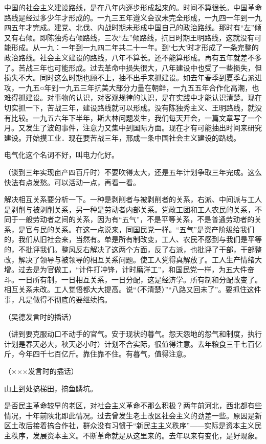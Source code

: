 中国的社会主义建设路线，是在八年内逐步形成起来的。时间不算很长。中国革命路线是经过多少年才形成的。一九三五年遵义会议未完全形成，一九四一年到一九四五年才完成。建党、北伐、内战时期未形成中国自己的政治路线。那时有“左”倾又有右倾。即陈独秀右倾路线，三次“左”倾路线，抗日时期王明路线，这就没有可能形成。从一九：一年到一九四二年共二十一年。到‘七大’时才形成了一条完整的政治路线。社会主义建设的路线，八年不算长。还不能算形成。再有五年就差不多了。苦战三年也可能形成。过去革命中损失很大，八年建设中也受了一些损失，但损失不大。同时这么时期也顾不上，抽不出手来抓建设。如去年春季到夏季右派进攻，一九五○年到一九五三年抗美大部分力量在朝鲜，一九五五年合作化高潮，也难得抓建设。对事物的认识，对客观规律的认识，是在实践中才能认识清楚。现在切实抓一下，苦战三年，建设路线就可以形成。没有陈独秀主义、王明路线，就没有比较。一九五六年下半年，斯大林问题发生，我们每天开会，一篇文章写了一个月。又发生了波匈事件，注意力又集中到国际方面。现在才有可能抽出时间来研究建设。开始摸工业．现在要苦战三年，邢成一条中国社会主义建设的路线。

电气化这个名词不好，叫电力化好。

（谈到三年实现亩产四百斤时）不要吹得太大，还是五年计划争取三年完成。这么快法有点发愁。可以活动一点，再看一看。

解决相互关系要分析一下。一种是剥削者与被剥削者的关系，右派、中间派与工人是剥削与被剥削关系，另一种是劳动者内部关系。党政工团和工人农民的关系，不同于一般劳动者之间的关系，因为有“五气”，不是平等关系，不是普通劳动者的关系，是官与民的关系。在这一点说来，同国民党一样。“五气”是资产阶级给我们的，我们从旧社会来，当然有。单是所有制改变，工人、农民不感到与我们是平等的，不批评我们。整风反右解决了这两个方面，反了右派，也批评了干部，干部整改，解决了领导与被领导的相互关系问题。使工人党得真解放了。工人生产情绪大增。过去是为官做工，“计件打冲锋，计时磨洋工”，和国民党一样，为五大件奋斗。一日所有制，一日相互关系，一日分配，这是经济学。所有制和分配改变了。相互关系未改。工人觉悟都大大提高。说“（不清楚）”“八路又回未了”。要抓住这件事，凡是做得不彻底的要继续搞。

（吴德发言时的插话）

（讲到要克服动口不动手的官气。安于现状的暮气。怨天怨地的怨气和制度，执行计划是春天必大，秋天必小时）计划不合实际，很值得注意。去年粮食三干七百亿斤，今年四千七百亿斤。靠住靠不住。有暮气，值得注意。

（×××发言时的插话）

山上到处搞梯田，搞鱼鳞坑。

是否民主革命较早的老区，对社会主义革命不那么积极？两年前河北，西北都有些情况，十年前陕北即此情况。过去曾发生老土改区社会主义的劲差一些。原因是新区土改后接着搞合作社，群众没有习惯于“新民主主义秩序”——实际是资本主义民主秩序，发展资本主义。不断革命就是从这里来的。去年以来有变化，是好现象。

